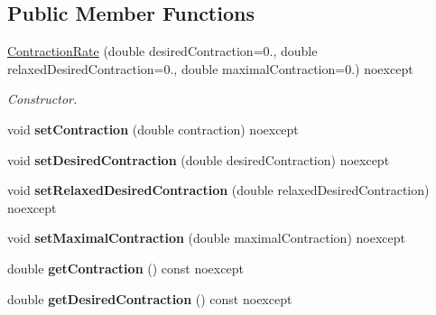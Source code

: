 \subsection*{Public Member Functions}
\begin{DoxyCompactItemize}
\item 
\hyperlink{classSpacy_1_1Mixin_1_1ContractionRate_aba4aa13aaed2899fc96a9f2b0a82d9ac}{Contraction\+Rate} (double desired\+Contraction=0., double relaxed\+Desired\+Contraction=0., double maximal\+Contraction=0.) noexcept
\begin{DoxyCompactList}\small\item\em Constructor. \end{DoxyCompactList}\item 
void {\bfseries set\+Contraction} (double contraction) noexcept\hypertarget{classSpacy_1_1Mixin_1_1ContractionRate_a962ded1f772cd3bb50d908f4a2c6b719}{}\label{classSpacy_1_1Mixin_1_1ContractionRate_a962ded1f772cd3bb50d908f4a2c6b719}

\item 
void {\bfseries set\+Desired\+Contraction} (double desired\+Contraction) noexcept\hypertarget{classSpacy_1_1Mixin_1_1ContractionRate_a765b52bc67df54bb8308015ddc5c926d}{}\label{classSpacy_1_1Mixin_1_1ContractionRate_a765b52bc67df54bb8308015ddc5c926d}

\item 
void {\bfseries set\+Relaxed\+Desired\+Contraction} (double relaxed\+Desired\+Contraction) noexcept\hypertarget{classSpacy_1_1Mixin_1_1ContractionRate_a9a80f5f3a6b98d57f8c1ef91609c685f}{}\label{classSpacy_1_1Mixin_1_1ContractionRate_a9a80f5f3a6b98d57f8c1ef91609c685f}

\item 
void {\bfseries set\+Maximal\+Contraction} (double maximal\+Contraction) noexcept\hypertarget{classSpacy_1_1Mixin_1_1ContractionRate_a52e5af055015fc8248da200cfbcd12aa}{}\label{classSpacy_1_1Mixin_1_1ContractionRate_a52e5af055015fc8248da200cfbcd12aa}

\item 
double {\bfseries get\+Contraction} () const noexcept\hypertarget{classSpacy_1_1Mixin_1_1ContractionRate_a493fe0b56583eed0d871ab0913702756}{}\label{classSpacy_1_1Mixin_1_1ContractionRate_a493fe0b56583eed0d871ab0913702756}

\item 
double {\bfseries get\+Desired\+Contraction} () const noexcept\hypertarget{classSpacy_1_1Mixin_1_1ContractionRate_a63ae4d2732c9e5b2093f41548dd6bacf}{}\label{classSpacy_1_1Mixin_1_1ContractionRate_a63ae4d2732c9e5b2093f41548dd6bacf}


\end{DoxyCompactItemize}
